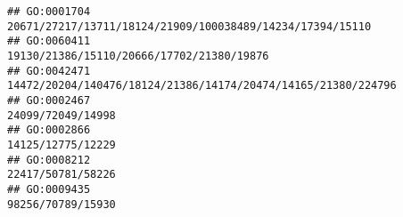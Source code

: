 \documentclass[
]{article}
\begin{document}
\begin{verbatim}
## GO:0001704                                                                                                                                                                                                                                                                                                                                                    20671/27217/13711/18124/21909/100038489/14234/17394/15110
## GO:0060411                                                                                                                                                                                                                                                                                                                                                                    19130/21386/15110/20666/17702/21380/19876
## GO:0042471                                                                                                                                                                                                                                                                                                                                                14472/20204/140476/18124/21386/14174/20474/14165/21380/224796
## GO:0002467                                                                                                                                                                                                                                                                                                                                                                                            24099/72049/14998
## GO:0002866                                                                                                                                                                                                                                                                                                                                                                                            14125/12775/12229
## GO:0008212                                                                                                                                                                                                                                                                                                                                                                                            22417/50781/58226
## GO:0009435                                                                                                                                                                                                                                                                                                                                                                                            98256/70789/15930

\end{verbatim}
\end{document}
